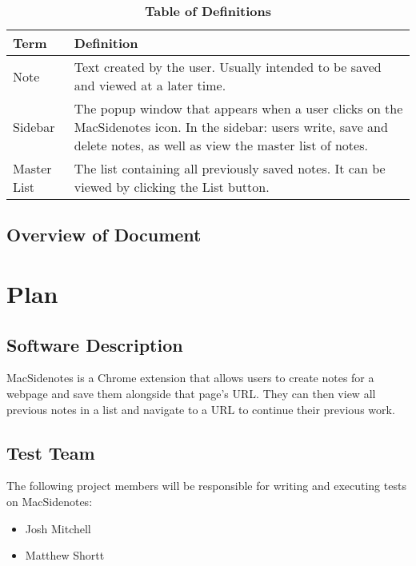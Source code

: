 \documentclass[12pt, titlepage]{article}
\begin{document}
\begin{table}[!htbp]
\caption{\textbf{Table of Definitions}} \label{Table}

\begin{tabularx}{\textwidth}{p{3cm}X}
\toprule
\textbf{Term} & \textbf{Definition}\\
\midrule
Note & Text created by the user. Usually intended to be saved and viewed at a  
later time.\\
Sidebar & The popup window that appears when a user clicks on the MacSidenotes 
icon. In the sidebar: users write, save and delete notes, as well as view the 
master list of notes.\\
Master List & The list containing all previously saved notes. It can be viewed 
by clicking the List button.\\
\bottomrule
\end{tabularx}

\end{table}	

\subsection{Overview of Document}

\section{Plan}
	
\subsection{Software Description}

MacSidenotes is a Chrome extension that allows users to create notes for a 
webpage and save them alongside that page's URL. They can then view all 
previous notes in a list and navigate to a URL to continue their previous work.

\subsection{Test Team}

The following project members will be responsible for writing and executing 
tests on MacSidenotes:

\begin{itemize}
	\item Josh Mitchell
	\item Matthew Shortt
\end{itemize}
\end{document}
